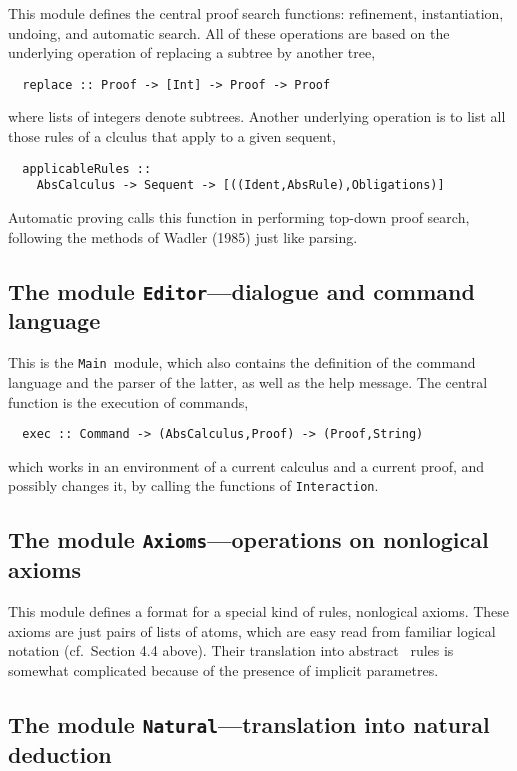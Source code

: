 This module defines the central proof search functions: refinement,
instantiation, undoing, and automatic search. All of these operations
are based on the underlying operation of replacing a subtree by another tree,
\begin{verbatim}
  replace :: Proof -> [Int] -> Proof -> Proof
\end{verbatim}
where lists of integers denote subtrees. Another underlying operation is to
list all those rules of a clculus that apply to a given sequent,
\begin{verbatim}
  applicableRules :: 
    AbsCalculus -> Sequent -> [((Ident,AbsRule),Obligations)]
\end{verbatim}
Automatic proving calls this function in performing top-down proof search,
following the methods of Wadler (1985) just like parsing.


\subsection{The module {\tt Editor}---dialogue and command language}

This is the {\tt Main}\ module, which also contains the definition of the
command language and the parser of the latter, as well as the help message.
The central function is the execution of commands, 
\begin{verbatim}
  exec :: Command -> (AbsCalculus,Proof) -> (Proof,String)
\end{verbatim}
which works in an environment of a current calculus and a current proof,
and possibly changes it, by calling the functions of {\tt Interaction}.


\subsection{The module {\tt Axioms}---operations on nonlogical axioms}

This module defines a format for a special kind of rules, nonlogical axioms.
These axioms are just pairs of lists of atoms, which are easy read from
familiar logical notation (cf.\ Section 4.4 above). Their translation into
abstract \PESC\ rules is somewhat complicated because of the presence
of implicit parametres.


\subsection{The module {\tt Natural}---translation into natural deduction}

